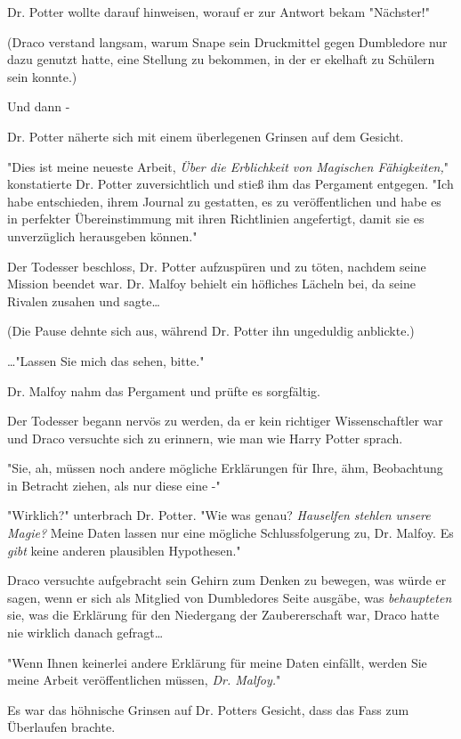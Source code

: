 {Dr. Potter wollte darauf hinweisen, worauf er zur Antwort bekam "Nächster!"

(Draco verstand langsam, warum Snape sein Druckmittel gegen Dumbledore nur dazu genutzt hatte, eine Stellung zu bekommen, in der er ekelhaft zu Schülern sein konnte.)

Und dann -

Dr. Potter näherte sich mit einem überlegenen Grinsen auf dem Gesicht.

"Dies ist meine neueste Arbeit, \emph{Über die Erblichkeit von Magischen Fähigkeiten,}" konstatierte Dr. Potter zuversichtlich und stieß ihm das Pergament entgegen. "Ich habe entschieden, ihrem Journal zu gestatten, es zu veröffentlichen und habe es in perfekter Übereinstimmung mit ihren Richtlinien angefertigt, damit sie es unverzüglich herausgeben können."

Der Todesser beschloss, Dr. Potter aufzuspüren und zu töten, nachdem seine Mission beendet war. Dr. Malfoy behielt ein höfliches Lächeln bei, da seine Rivalen zusahen und sagte…

(Die Pause dehnte sich aus, während Dr. Potter ihn ungeduldig anblickte.)

…"Lassen Sie mich das sehen, bitte."

Dr. Malfoy nahm das Pergament und prüfte es sorgfältig.

Der Todesser begann nervös zu werden, da er kein richtiger Wissenschaftler war und Draco versuchte sich zu erinnern, wie man wie Harry Potter sprach.

"Sie, ah, müssen noch andere mögliche Erklärungen für Ihre, ähm, Beobachtung in Betracht ziehen, als nur diese eine -"

"Wirklich?" unterbrach Dr. Potter. "Wie was genau? \emph{Hauselfen} \emph{stehlen unsere Magie?} Meine Daten lassen nur eine mögliche Schlussfolgerung zu, Dr. Malfoy. Es \emph{gibt} keine anderen plausiblen Hypothesen."

Draco versuchte aufgebracht sein Gehirn zum Denken zu bewegen, was würde er sagen, wenn er sich als Mitglied von Dumbledores Seite ausgäbe, was \emph{behaupteten} sie, was die Erklärung für den Niedergang der Zaubererschaft war, Draco hatte nie wirklich danach gefragt…

"Wenn Ihnen keinerlei andere Erklärung für meine Daten einfällt, werden Sie meine Arbeit veröffentlichen müssen, \emph{Dr. Malfoy.}"

Es war das höhnische Grinsen auf Dr. Potters Gesicht, dass das Fass zum Überlaufen brachte.

}
